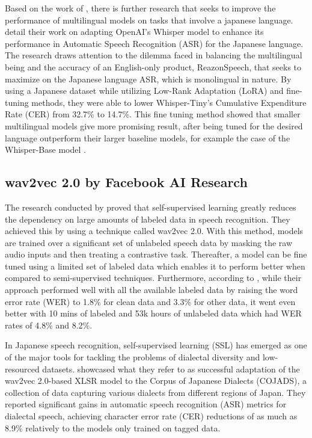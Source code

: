 Based on the work of \textcite{radford2023robust}, there is further research that seeks to improve the performance of multilingual models on tasks that involve a japanese language. \textcite{bajo2024efficient} detail their work on adapting OpenAI’s Whisper model to enhance its performance in Automatic Speech Recognition (ASR) for the Japanese language. The research draws attention to the dilemma faced in balancing the multilingual being and the accuracy of an English-only product, ReazonSpeech, that seeks to maximize on the Japanese language ASR, which is monolingual in nature. By using a Japanese dataset while utilizing Low-Rank Adaptation (LoRA) and fine-tuning methods, they were able to lower Whisper-Tiny’s Cumulative Expenditure Rate (CER) from 32.7\% to 14.7\%. This fine tuning method showed that smaller multilingual models give more promising result, after being tuned for the desired language outperform their larger baseline models, for example the case of the Whisper-Base model \parencite{bajo2024efficient}.

\subsection{wav2vec 2.0 by Facebook AI Research}
The research conducted by \textcite{baevski2020wav2vec} proved that self-supervised learning greatly reduces the dependency on large amounts of labeled data in speech recognition. They achieved this by using a technique called wav2vec 2.0. With this method, models are trained over a significant set of unlabeled speech data by masking the raw audio inputs and then treating a contrastive task. Thereafter, a model can be fine tuned using a limited set of labeled data which enables it to perform better when compared to semi-supervised techniques. Furthermore, according to \textcite{baevski2020wav2vec}, while their approach performed well with all the available labeled data by raising the word error rate (WER) to 1.8\% for clean data and 3.3\% for other data, it went even better with 10 mins of labeled and 53k hours of unlabeled data which had WER rates of 4.8\% and 8.2\%.


In Japanese speech recognition, self-supervised learning (SSL) has emerged as one of the major tools for tackling the problems of dialectal diversity and low-resourced datasets. \textcite{miwa2023dialect} showcased what they refer to as successful adaptation of the wav2vec 2.0-based XLSR model to the Corpus of Japanese Dialects (COJADS), a collection of data capturing various dialects from different regions of Japan. They reported significant gains in automatic speech recognition (ASR) metrics for dialectal speech, achieving character error rate (CER) reductions of as much as 8.9\% relatively to the models only trained on tagged data. 


